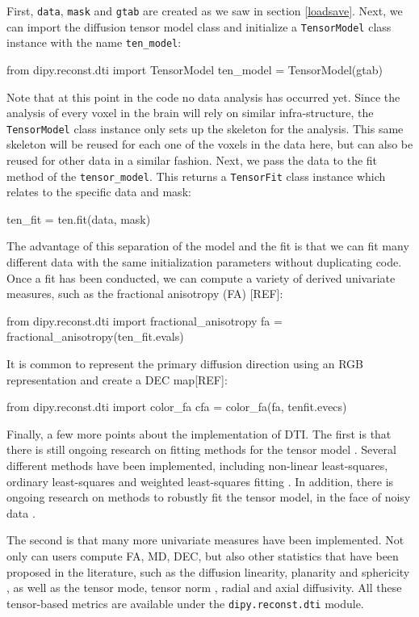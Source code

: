 \documentclass{bioinfo}
\begin{document}
First, \texttt{data}, \texttt{mask} and \texttt{gtab} are created as we saw in section \ref{loadsave}. Next, we can import the diffusion tensor model class and initialize a \texttt{TensorModel} class instance with the name \texttt{ten\_model}:
\begin{python}
from dipy.reconst.dti import TensorModel
ten_model = TensorModel(gtab)
\end{python}
Note that at this point in the code no data analysis has occurred yet. Since the analysis of every voxel in the brain will rely on similar infra-structure, the \texttt{TensorModel} class instance only sets up the skeleton for the analysis. This same skeleton will be reused for each one of the voxels in the data here, but can also be reused for other data in a similar fashion.
Next, we pass the data to the fit method of the \texttt{tensor\_model}. This returns a \texttt{TensorFit} class instance which relates to the specific data and mask:
\begin{python}
ten_fit = ten.fit(data, mask)
\end{python}
The advantage of this separation of the model and the fit is that we can fit many different data with the same initialization parameters without duplicating code. Once a fit has been conducted, we can compute a variety of derived univariate measures, such as the fractional anisotropy (FA) [REF]:
\begin{python}
from dipy.reconst.dti import fractional_anisotropy
fa = fractional_anisotropy(ten_fit.evals)
\end{python}
It is common to represent the primary diffusion direction using an RGB representation and create a DEC map[REF]:
\begin{python}
from dipy.reconst.dti import color_fa
cfa = color_fa(fa, tenfit.evecs)
\end{python}
Finally, a few more points about the implementation of DTI. The first is that there is still ongoing research on fitting methods for the tensor model \citep{Koay2006}. Several different methods have been implemented, including non-linear least-squares, ordinary least-squares and weighted least-squares fitting \citep{chung-lu-etal:06}. In addition, there is ongoing research on methods to robustly fit the tensor model, in the face of noisy data \citep{Chang2005, Chang2012}. %

The second is that many more univariate measures have been implemented. Not only can users compute FA, MD, DEC, but also other statistics that have been proposed in the literature, such as the diffusion linearity, planarity and sphericity \citep{westin:97}, as well as the tensor mode, tensor norm \cite{Ennis2006}, radial and axial diffusivity. All these tensor-based metrics are available under the \texttt{dipy.reconst.dti} module.
\end{document}
